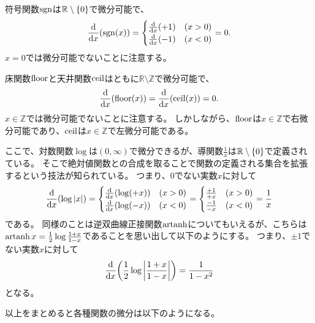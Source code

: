 符号関数$\operatorname{sgn}$は$\mathbb{R}\setminus\{0\}$で微分可能で、
$$
\dv{x}(\operatorname{sgn}(x))
=
\begin{cases}
\dv{x}(+1) & (x > 0) \\
\dv{x}(-1) & (x < 0) \\
\end{cases}
= 0.
$$
$x = 0$では微分可能でないことに注意する。

床関数$\operatorname{floor}$と天井関数$\operatorname{ceil}$はともに$\mathbb{R}\setminus\mathbb{Z}$で微分可能で、
$$
\dv{x}(\operatorname{floor}(x))
= \dv{x}(\operatorname{ceil}(x))
= 0.
$$
$x \in \mathbb{Z}$では微分可能でないことに注意する。
しかしながら、$\operatorname{floor}$は$x \in \mathbb{Z}$で右微分可能であり、$\operatorname{ceil}$は$x \in \mathbb{Z}$で左微分可能である。

ここで、対数関数$\log$は$(0, \infty)$で微分できるが、導関数$\frac{1}{x}$は$\mathbb{R}\setminus\{0\}$で定義されている。
そこで絶対値関数との合成を取ることで関数の定義される集合を拡張するという技法が知られている。
つまり、$0$でない実数$x$に対して
$$
\dv{x}(\log|x|)
=
\begin{cases}
\dv{x}(\log(+x)) & (x > 0) \\
\dv{x}(\log(-x)) & (x < 0) \\
\end{cases}
=
\begin{cases}
\frac{+1}{+x} & (x > 0) \\
\frac{-1}{-x} & (x < 0) \\
\end{cases}
= \frac{1}{x}
$$
である。
同様のことは逆双曲線正接関数$\operatorname{artanh}$についてもいえるが、こちらは$\operatorname{artanh} x = \frac{1}{2}\log\frac{1+x}{1-x}$であることを思い出して以下のようにする。
つまり、$\pm 1$でない実数$x$に対して
$$
\dv{x}\qty(\frac{1}{2}\log\abs{\frac{1+x}{1-x}}) = \frac{1}{1-x^2}
$$
となる。

以上をまとめると各種関数の微分は以下のようになる。

